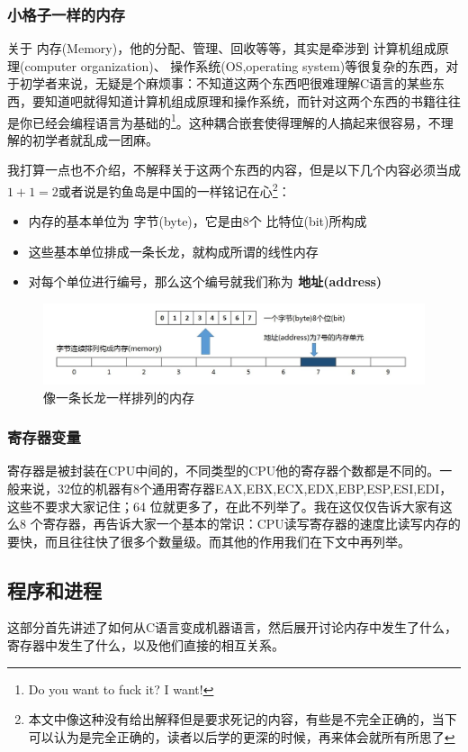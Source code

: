 \documentclass[11pt,twoside,a4paper,titlepage]{article}	%
\newcommand{\kw}[1]{\textcolor[rgb]{0.0,0.0,0.63}{ #1}}
\begin{document}
\subsubsection{小格子一样的内存}
关于\kw{内存(Memory)}，他的分配、管理、回收等等，其实是牵涉到\kw{计算机组成原理(computer organization)}、\kw{操作系统(OS,operating system)}等很复杂的东西，对于初学者来说，无疑是个麻烦事：不知道这两个东西吧很难理解C语言的某些东西，要知道吧就得知道计算机组成原理和操作系统，而针对这两个东西的书籍往往是你已经会编程语言为基础的\footnote{Do you want to fuck it? I want!}。这种耦合嵌套使得理解的人搞起来很容易，不理解的初学者就乱成一团麻。

我打算一点也不介绍，不解释关于这两个东西的内容，但是以下几个内容必须当成$1+1=2$或者说是钓鱼岛是中国的一样铭记在心\footnote{本文中像这种没有给出解释但是要求死记的内容，有些是不完全正确的，当下可以认为是完全正确的，读者以后学的更深的时候，再来体会就所有所思了}：
\begin{itemize}
	\item 内存的基本单位为\kw{字节(byte)}，它是由8个\kw{比特位(bit)}所构成
	\item 这些基本单位排成一条长龙，就构成所谓的线性内存
	\item 对每个单位进行编号，那么这个编号就我们称为\textbf{\kw{地址(address)}}
\end{itemize}

\begin{figure}[htbp]
\centering
\includegraphics[scale=.5]{../src/memory_01.jpg}
\caption{像一条长龙一样排列的内存}
\label{fig:memory_01}
\end{figure}

\newpage
\subsubsection{寄存器变量}
寄存器是被封装在CPU中间的，不同类型的CPU他的寄存器个数都是不同的。一般来说，32位的机器有8个通用寄存器EAX,EBX,ECX,EDX,EBP,ESP,ESI,EDI，这些不要求大家记住；64 位就更多了，在此不列举了。我在这仅仅告诉大家有这么8 个寄存器，再告诉大家一个基本的常识：CPU读写寄存器的速度比读写内存的要快，而且往往快了很多个数量级。而其他的作用我们在下文中再列举。

\subsection{程序和进程}
这部分首先讲述了如何从C语言变成机器语言，然后展开讨论内存中发生了什么，寄存器中发生了什么，以及他们直接的相互关系。
\end{document}
